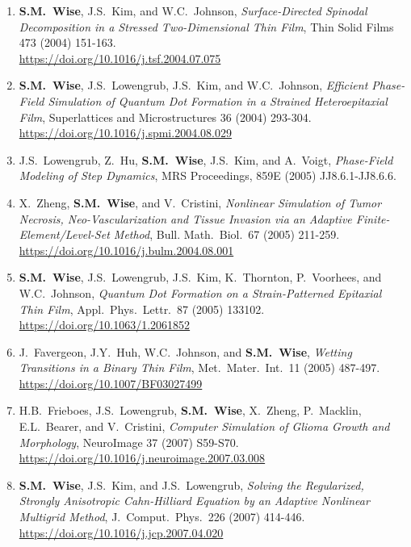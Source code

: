 \documentclass[10pt,letterpaper]{article}
\begin{document}
\begin{enumerate}
    \item
\textbf{S.M.~Wise}, J.S.~Kim, and W.C.~Johnson, {\sl Surface-Directed Spinodal Decomposition in a Stressed Two-Dimensional Thin Film}, Thin Solid Films 473 (2004) 151-163.
	\\
\url{https://doi.org/10.1016/j.tsf.2004.07.075}

    \item
\textbf{S.M.~Wise}, J.S.~Lowengrub, J.S.~Kim, and W.C.~Johnson, {\sl Efficient Phase-Field Simulation of Quantum Dot Formation in a Strained Heteroepitaxial Film}, Superlattices and Microstructures 36 (2004) 293-304.
	\\
\url{https://doi.org/10.1016/j.spmi.2004.08.029}

    \item
J.S.~Lowengrub, Z.~Hu, \textbf{S.M.~Wise}, J.S.~Kim, and A.~Voigt, {\sl Phase-Field Modeling of Step Dynamics}, MRS Proceedings, 859E (2005) JJ8.6.1-JJ8.6.6.

    \item
X.~Zheng, \textbf{S.M.~Wise}, and V.~Cristini, {\sl Nonlinear Simulation of Tumor Necrosis, Neo-Vascularization and Tissue Invasion via an Adaptive Finite-Element/Level-Set Method}, Bull. Math.~Biol.~67 (2005) 211-259.
	\\
\url{https://doi.org/10.1016/j.bulm.2004.08.001}

    \item
\textbf{S.M.~Wise}, J.S.~Lowengrub, J.S.~Kim, K.~Thornton, P.~Voorhees, and W.C.~Johnson, {\sl Quantum Dot Formation on a Strain-Patterned Epitaxial Thin Film}, Appl.~Phys.~Lettr.~87 (2005) 133102.
	\\
\url{https://doi.org/10.1063/1.2061852}

	\item
J.~Favergeon, J.Y.~Huh, W.C.~Johnson, and \textbf{S.M.~Wise}, {\sl Wetting Transitions in a Binary Thin Film}, Met.~Mater.~Int.~11 (2005) 487-497.
	\\
\url{https://doi.org/10.1007/BF03027499}

    \item
H.B.~Frieboes, J.S.~Lowengrub, \textbf{S.M.~Wise}, X.~Zheng, P.~Macklin, E.L.~Bearer, and V.~Cristini, {\sl Computer Simulation of Glioma Growth and Morphology}, NeuroImage  37 (2007) S59-S70.
	\\
\url{https://doi.org/10.1016/j.neuroimage.2007.03.008}

    \item
\textbf{S.M.~Wise}, J.S.~Kim, and J.S.~Lowengrub, {\sl Solving the Regularized, Strongly Anisotropic Cahn-Hilliard Equation by an Adaptive Nonlinear Multigrid Method}, J.~Comput.~Phys.~226 (2007) 414-446.
	\\
\url{https://doi.org/10.1016/j.jcp.2007.04.020}


\end{enumerate}
\end{document}
